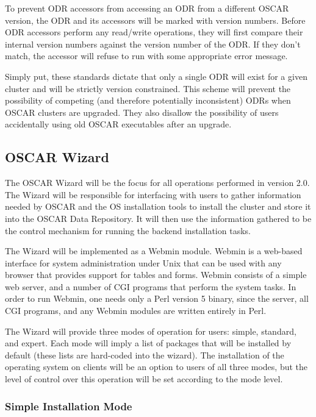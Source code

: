 To prevent ODR accessors from accessing an ODR from a different OSCAR
version, the ODR and its accessors will be marked with version
numbers.  Before ODR accessors perform any read/write operations, they
will first compare their internal version numbers against the version
number of the ODR.  If they don't match, the accessor will refuse to
run with some appropriate error message.

Simply put, these standards dictate that only a single ODR will exist
for a given cluster and will be strictly version constrained.  This
scheme will prevent the possibility of competing (and therefore
potentially inconsistent) ODRs when OSCAR clusters are upgraded.  They
also disallow the possibility of users accidentally using old OSCAR
executables after an upgrade.

\subsection{OSCAR Wizard}
\label{sec:design-wizard}

The OSCAR Wizard will be the focus for all operations performed in
version 2.0. The Wizard will be responsible for interfacing with users
to gather information needed by OSCAR and the OS installation tools to
install the cluster and store it into the OSCAR Data Repository. It
will then use the information gathered to be the control mechanism for
running the backend installation tasks.

The Wizard will be implemented as a Webmin module. Webmin is a
web-based interface for system administration under Unix that can be
used with any browser that provides support for tables and
forms. Webmin consists of a simple web server, and a number of CGI
programs that perform the system tasks. In order to run Webmin, one
needs only a Perl version 5 binary, since the server, all CGI
programs, and any Webmin modules are written entirely in Perl.

The Wizard will provide three modes of operation for users: simple,
standard, and expert.  Each mode will imply a list of packages that
will be installed by default (these lists are hard-coded into the
wizard).  The installation of the operating system on clients will be
an option to users of all three modes, but the level of control over
this operation will be set according to the mode level.

\subsubsection{Simple Installation Mode}

